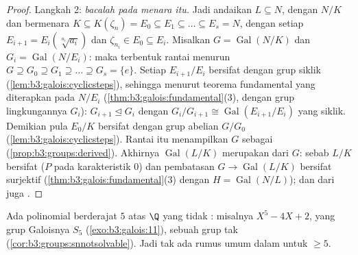\begin{proof}
Langkah 2: \emph{bacalah  pada menara  itu.} Jadi andaikan
$L \subseteq N$, dengan $N/K$  dan  bermenara $K
\subseteq K(\zeta_n) = E_0 \subseteq E_1 \subseteq \dots
\subseteq E_s = N$, dengan setiap $E_{i+1} = E_i(\sqrt[n_i]{a_i})$ dan
$\zeta_{n_i} \in E_0 \subseteq E_i$. Misalkan $G =
\operatorname{Gal}(N/K)$ dan $G_i = \operatorname{Gal}(N/E_i)$:
maka terbentuk rantai menurun $G \supseteq G_0 \supseteq G_1 \supseteq
\dots \supseteq G_s = \{e\}$. Setiap $E_{i+1}/E_i$ bersifat  dengan
grup siklik (\cref{lem:b3:galois:cyclicsteps}), sehingga menurut
teorema fundamental yang diterapkan pada  $N/E_i$
(\cref{thm:b3:galois:fundamental}(3), dengan grup lingkungannya $G_i$):
$G_{i+1} \trianglelefteq G_i$ dengan $G_i/G_{i+1} \cong
\operatorname{Gal}(E_{i+1}/E_i)$ yang siklik. Demikian pula $E_0/K$ bersifat
 dengan grup abelian $G/G_0$
(\cref{lem:b3:galois:cyclicsteps}). Rantai itu menampilkan $G$ sebagai
 (\cref{prop:b3:groups:derived}). Akhirnya
$\operatorname{Gal}(L/K)$ merupakan \emph{} dari $G$: sebab $L/K$ bersifat
 ($P$  pada karakteristik $0$) dan pembatasan $G
\to \operatorname{Gal}(L/K)$ bersifat surjektif
(\cref{thm:b3:galois:fundamental}(3) dengan $H =
\operatorname{Gal}(N/L)$); dan  dari  juga
.
\end{proof}

\begin{corollary}
\label{cor:b3:galois:quintic}
Ada polinomial berderajat $5$ atas $\Q$ yang tidak
: misalnya $X^5 - 4X + 2$, yang grup
Galoisnya $S_5$ (\cref{exo:b3:galois:11}), sebuah grup tak 
(\cref{cor:b3:groups:snnotsolvable}). Jadi tak ada rumus umum dalam
 untuk  $\geq 5$.
\end{corollary}

